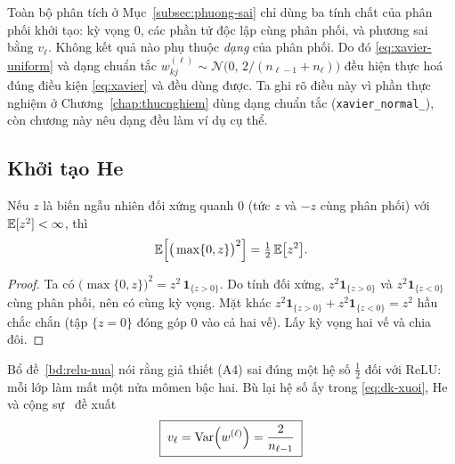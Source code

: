 \begin{nhanxet}
\label{nx:xavier-dang}
Toàn bộ phân tích ở Mục~\ref{subsec:phuong-sai} chỉ dùng ba tính chất của phân
phối khởi tạo: kỳ vọng $0$, các phần tử độc lập cùng phân phối, và phương sai
bằng $v_\ell$. Không kết quả nào phụ thuộc \emph{dạng} của phân phối. Do đó
\eqref{eq:xavier-uniform} và dạng chuẩn tắc
$w^{(\ell)}_{kj}\sim\mathcal{N}\big(0,\,2/(n_{\ell-1}+n_\ell)\big)$ đều hiện thực
hoá đúng điều kiện \eqref{eq:xavier} và đều dùng được. Ta ghi rõ điều này vì
phần thực nghiệm ở Chương~\ref{chap:thucnghiem} dùng dạng chuẩn tắc
(\texttt{xavier\_normal\_}), còn chương này nêu dạng đều làm ví dụ cụ thể.
\end{nhanxet}
 
\subsection{Khởi tạo He}
\label{subsec:he}
 
\begin{bode}
\label{bd:relu-nua}
Nếu $z$ là biến ngẫu nhiên đối xứng quanh $0$ (tức $z$ và $-z$ cùng phân phối)
với $\mathbb{E}[z^2] < \infty$, thì
\begin{equation}
\mathbb{E}\Big[\big(\max\{0,z\}\big)^2\Big] = \tfrac{1}{2}\,\mathbb{E}\big[z^2\big].
\label{eq:relu-nua-phuong-sai}
\end{equation}
\end{bode}
 
\begin{proof}
Ta có $\big(\max\{0,z\}\big)^2 = z^2\,\mathbf{1}_{\{z>0\}}$. Do tính đối xứng,
$z^2\mathbf{1}_{\{z>0\}}$ và $z^2\mathbf{1}_{\{z<0\}}$ cùng phân phối, nên có
cùng kỳ vọng. Mặt khác
$z^2\mathbf{1}_{\{z>0\}} + z^2\mathbf{1}_{\{z<0\}} = z^2$ hầu chắc chắn (tập
$\{z=0\}$ đóng góp $0$ vào cả hai vế). Lấy kỳ vọng hai vế và chia đôi.
\end{proof}
 
Bổ đề~\ref{bd:relu-nua} nói rằng giả thiết (A4) sai đúng một hệ số $\tfrac12$
đối với ReLU: mỗi lớp làm mất một nửa mômen bậc hai. Bù lại hệ số ấy trong
\eqref{eq:dk-xuoi}, He và cộng sự~\cite{he2015} đề xuất
\begin{equation}
\boxed{\;
v_\ell = \operatorname{Var}\!\left(w^{(\ell)}\right) = \frac{2}{n_{\ell-1}} \; }
\label{eq:he}
\end{equation}
 
